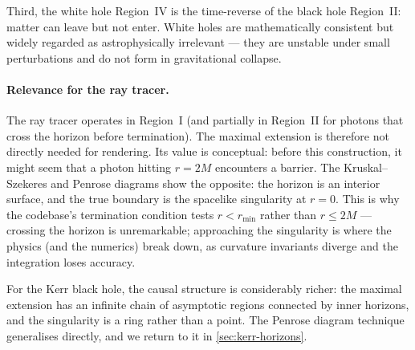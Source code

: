 Third, the white hole Region~IV is the time-reverse of the black hole
Region~II: matter can leave but not enter.  White holes are
mathematically consistent but widely regarded as astrophysically
irrelevant --- they are unstable under small perturbations and do not
form in gravitational collapse.

\paragraph{Relevance for the ray tracer.}

The ray tracer operates in Region~I (and partially in Region~II for
photons that cross the horizon before termination).  The maximal
extension is therefore not directly needed for rendering.  Its value
is conceptual: before this construction, it might seem that a photon
hitting $r = 2M$ encounters a barrier.  The Kruskal--Szekeres and
Penrose diagrams show the opposite: the horizon is an interior surface,
and the true boundary is the spacelike singularity at $r = 0$.  This
is why the codebase's termination condition tests $r < r_{\min}$ rather
than $r \leq 2M$ --- crossing the horizon is unremarkable; approaching
the singularity is where the physics (and the numerics) break down, as
curvature invariants diverge and the integration loses accuracy.

For the Kerr black hole, the causal structure is considerably richer:
the maximal extension has an infinite chain of asymptotic regions
connected by inner horizons, and the singularity is a ring rather
than a point.  The Penrose diagram technique generalises directly,
and we return to it in \cref{sec:kerr-horizons}.
